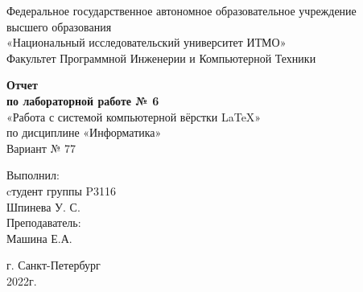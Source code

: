 \thispagestyle{empty}

\begin{center}
	\vspace{2cm}
	Федеральное государственное автономное образовательное учреждение\\ 
	высшего образования\\
	«Национальный исследовательский университет ИТМО»\\
	
	Факультет Программной Инженерии и Компьютерной Техники
\end{center}
\vspace{4cm}
\begin{center}
	\large\textbf{Отчет\\}
	\textbf{по лабораторной работе № 6}\\
	«Работа с системой компьютерной вёрстки \LaTeX» \\
	по дисциплине «Информатика»\\
	Вариант № 77
\end{center}
\vspace{6cm}
\begin{flushright}
	Выполнил:\\
	cтудент группы P3116\\
	Шпинева У. С.\\
	Преподаватель: \\
	Машина Е.А.\\
\end{flushright}
\vspace{6cm}
\begin{center}
	г. Санкт-Петербург\\
	2022г.
\end{center}